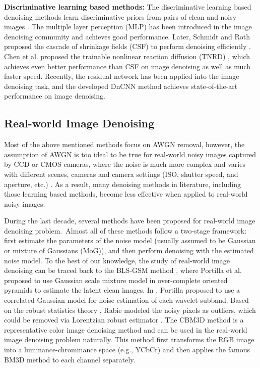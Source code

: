 \textbf{Discriminative learning based methods:} The discriminative learning based denoising methods learn discriminative priors from pairs of clean and noisy images \cite{mlp,csf,tnrd, dncnn}. The multiple layer perception (MLP) \cite{mlp} has been introduced in the image denoising community and achieves good performance. Later, Schmidt and Roth proposed the cascade of shrinkage fields (CSF) to perform denoising efficiently \cite{csf}. Chen et al. proposed the trainable nonlinear reaction diffusion (TNRD) \cite{tnrd}, which achieves even better performance than CSF on image denoising as well as much faster speed. Recently, the residual network \cite{residualnetwork} has been applied into the image denoising task, and the developed DnCNN method \cite{dncnn} achieves state-of-the-art performance on image denoising.

\subsection{Real-world Image Denoising}
\label{sec:review:feature}

Most of the above mentioned methods focus on AWGN removal, however, the assumption of AWGN is too ideal to be true for real-world noisy images captured by CCD or CMOS cameras, where the noise is much more complex and varies with different scenes, cameras and camera settings (ISO, shutter speed, and aperture, etc.) \cite{crosschannel2016,karaimer_brown_ECCV_2016,dnd2017}. As a result, many denoising methods in literature, including those learning based methods, become less effective when applied to real-world noisy images.

During the last decade, several methods \cite{blsgsm,fullyblind,huber2011robust,rabie2005robust,cbm3d,Liu2008,noiseclinic,Zhu_2016_CVPR,
crosschannel2016,neatimage} have been proposed for real-world image denoising problem.\ Almost all of these methods follow a two-stage framework: first estimate the parameters of the noise model (usually assumed to be Gaussian or mixture of Gaussians (MoG)), and then perform denoising with the estimated noise model. To the best of our knowledge, the study of real-world image denoising can be traced back to the BLS-GSM method \cite{blsgsm}, where Portilla et al. proposed to use Gaussian scale mixture model in over-complete oriented pyramids to estimate the latent clean images. In \cite{fullyblind}, Portilla proposed to use a correlated Gaussian model for noise estimation of each wavelet subband. Based on the robust statistics theory \cite{huber2011robust}, Rabie modeled the noisy pixels as outliers, which could be removed via Lorentzian robust estimator \cite{rabie2005robust}. The CBM3D method \cite{cbm3d} is a representative color image denoising method and can be used in the real-world image denoising problem naturally. This method first transforms the RGB image into a luminance-chrominance space (e.g., YCbCr) and then applies the famous BM3D method \cite{bm3d} to each channel separately.

